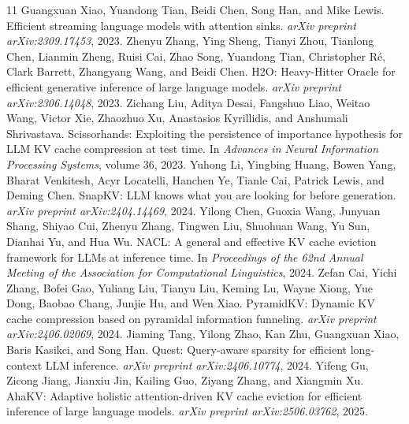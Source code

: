 \documentclass[10pt,twocolumn]{article}
\begin{document}
\balance
\begin{thebibliography}{11}
 Guangxuan Xiao, Yuandong Tian, Beidi Chen, Song Han, and Mike Lewis. \newblock Efficient streaming language models with attention sinks. \newblock \emph{arXiv preprint arXiv:2309.17453}, 2023.
 Zhenyu Zhang, Ying Sheng, Tianyi Zhou, Tianlong Chen, Lianmin Zheng, Ruisi Cai, Zhao Song, Yuandong Tian, Christopher R\'e, Clark Barrett, Zhangyang Wang, and Beidi Chen. \newblock H2O: Heavy-Hitter Oracle for efficient generative inference of large language models. \newblock \emph{arXiv preprint arXiv:2306.14048}, 2023.
 Zichang Liu, Aditya Desai, Fangshuo Liao, Weitao Wang, Victor Xie, Zhaozhuo Xu, Anastasios Kyrillidis, and Anshumali Shrivastava. \newblock Scissorhands: Exploiting the persistence of importance hypothesis for LLM KV cache compression at test time. \newblock In \emph{Advances in Neural Information Processing Systems}, volume 36, 2023.
 Yuhong Li, Yingbing Huang, Bowen Yang, Bharat Venkitesh, Acyr Locatelli, Hanchen Ye, Tianle Cai, Patrick Lewis, and Deming Chen. \newblock SnapKV: LLM knows what you are looking for before generation. \newblock \emph{arXiv preprint arXiv:2404.14469}, 2024.
 Yilong Chen, Guoxia Wang, Junyuan Shang, Shiyao Cui, Zhenyu Zhang, Tingwen Liu, Shuohuan Wang, Yu Sun, Dianhai Yu, and Hua Wu. \newblock NACL: A general and effective KV cache eviction framework for LLMs at inference time. \newblock In \emph{Proceedings of the 62nd Annual Meeting of the Association for Computational Linguistics}, 2024.
 Zefan Cai, Yichi Zhang, Bofei Gao, Yuliang Liu, Tianyu Liu, Keming Lu, Wayne Xiong, Yue Dong, Baobao Chang, Junjie Hu, and Wen Xiao. \newblock PyramidKV: Dynamic KV cache compression based on pyramidal information funneling. \newblock \emph{arXiv preprint arXiv:2406.02069}, 2024.
 Jiaming Tang, Yilong Zhao, Kan Zhu, Guangxuan Xiao, Baris Kasikci, and Song Han. \newblock Quest: Query-aware sparsity for efficient long-context LLM inference. \newblock \emph{arXiv preprint arXiv:2406.10774}, 2024.
 Yifeng Gu, Zicong Jiang, Jianxiu Jin, Kailing Guo, Ziyang Zhang, and Xiangmin Xu. \newblock AhaKV: Adaptive holistic attention-driven KV cache eviction for efficient inference of large language models. \newblock \emph{arXiv preprint arXiv:2506.03762}, 2025.

\end{thebibliography}
\end{document}
